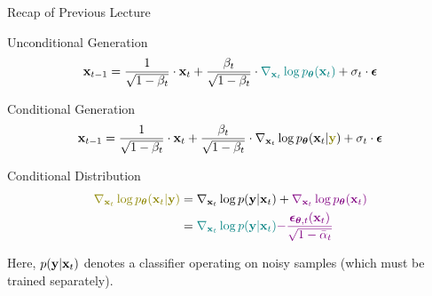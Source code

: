 \documentclass{beamer}
\begin{document}
\begin{frame}{Recap of Previous Lecture}
	\begin{block}{Unconditional Generation}
		\vspace{-0.3cm}
		\[
			\mathbf{x}_{t - 1} = \frac{1}{\sqrt{1 - \beta_t}} \cdot \mathbf{x}_t + \frac{\beta_t}{\sqrt{1 - \beta_t}} \cdot {\color{teal} \nabla_{\mathbf{x}_t} \log p_{\boldsymbol{\theta}}(\mathbf{x}_t)} +  \sigma_t \cdot \boldsymbol{\epsilon}
		\]
		\vspace{-0.5cm}
	\end{block}
	\begin{block}{Conditional Generation}
		\vspace{-0.5cm}
		\[
			\bx_{t - 1} =  \frac{1}{\sqrt{1 - \beta_t}}\cdot \bx_t +  \frac{\beta_t}{\sqrt{1 - \beta_t}}  \cdot  \nabla_{\bx_t} \log \pt(\bx_t | {\color{olive}\by}) +  \sigma_t \cdot \bepsilon
		\]
		\vspace{-0.5cm}
	\end{block}
	\begin{block}{Conditional Distribution}
		\vspace{-0.5cm}
		\begin{align*}
			{\color{olive}\nabla_{\bx_t} \log \pt(\bx_t | \by)} &= \nabla_{\bx_t} \log p(\by | \bx_t) + {\color{violet}\nabla_{\bx_t} \log \pt(\bx_t)}\\
			&= {\color{teal}\nabla_{\bx_t} \log p(\by | \bx_t)} {\color{violet}- \frac{\bepsilon_{\btheta, t}(\bx_t)}{\sqrt{1 - \bar{\alpha}_t}}}
		\end{align*}
		\vspace{-0.5cm}
	\end{block}
	Here, $p(\mathbf{y} | \mathbf{x}_t)$ denotes a classifier operating on noisy samples (which must be trained separately).
\end{frame}
\end{document}
